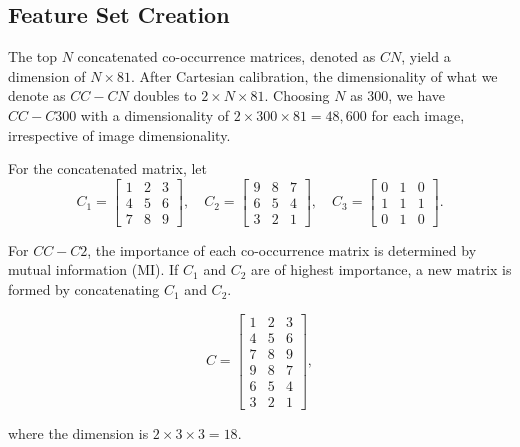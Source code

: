 \subsection*{Feature Set Creation}

The top $N$ concatenated co-occurrence matrices, denoted as $CN$, yield a dimension of $N \times 81$. After Cartesian calibration, the dimensionality of what we denote as $CC-CN$ doubles to $2 \times N \times 81$. Choosing $N$ as 300, we have $CC-C300$ with a dimensionality of $2 \times 300 \times 81 = 48,600$ for each image, irrespective of image dimensionality.

For the concatenated matrix, let
\[
    C_1 = \begin{bmatrix} 1 & 2 & 3 \\ 4 & 5 & 6 \\ 7 & 8 & 9 \end{bmatrix}, \quad
    C_2 = \begin{bmatrix} 9 & 8 & 7 \\ 6 & 5 & 4 \\ 3 & 2 & 1 \end{bmatrix}, \quad
    C_3 = \begin{bmatrix} 0 & 1 & 0 \\ 1 & 1 & 1 \\ 0 & 1 & 0 \end{bmatrix}.
\]

For $CC-C2$, the importance of each co-occurrence matrix is determined by mutual information (MI). If $C_1$ and $C_2$ are of highest importance, a new matrix is formed by concatenating $C_1$ and $C_2$.

\[
    C = \begin{bmatrix} 1 & 2 & 3 \\ 4 & 5 & 6 \\ 7 & 8 & 9 \\ 9 & 8 & 7 \\ 6 & 5 & 4 \\ 3 & 2 & 1 \end{bmatrix},
\]

where the dimension is $2 \times 3 \times 3 = 18$.

